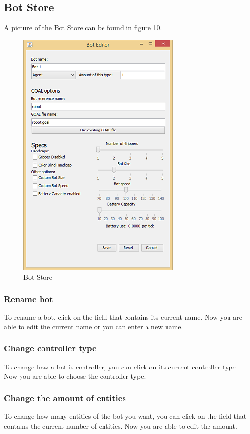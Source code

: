 \documentclass[11pt,a4paper]{article}
\begin{document}
\subsection{Bot Store}
A picture of the Bot Store can be found in figure 10.
\begin{figure}[h]
\begin{center}
\includegraphics{bs.png}
\end{center}
\caption{Bot Store}
\end{figure}
\subsubsection{Rename bot}
To rename a bot, click on the field that contains its current name. Now you are able to edit the current name or you can enter a new name.

\subsubsection{Change controller type}
To change how a bot is controller, you can click on its current controller type. Now you are able to choose the controller type.

\subsubsection{Change the amount of entities}
To change how many entities of the bot you want, you can click on the field that contains the current number of entities. Now you are able to edit the amount.
\end{document}
